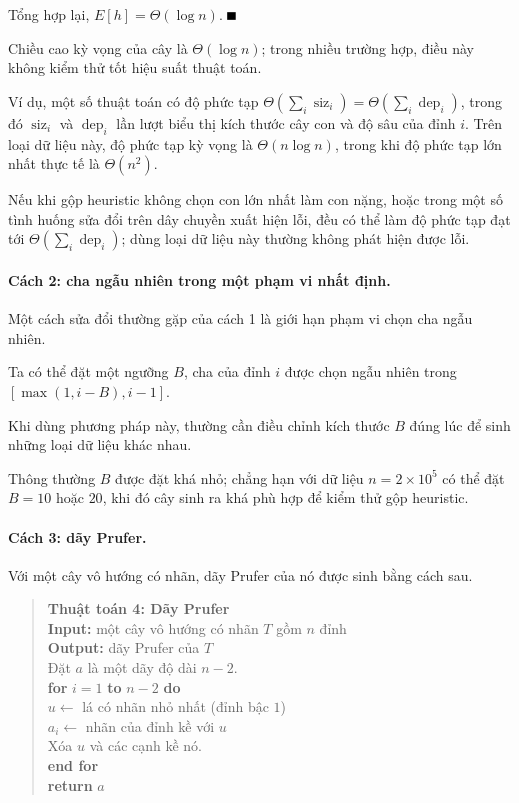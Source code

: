 \documentclass[11pt]{article}
\providecommand{\square}{\mathord{\vcenter{\hrule height .6em width .6em}}}
\begin{document}
Tổng hợp lại, $E[h]=\Theta(\log n)$. \hfill$\square$

Chiều cao kỳ vọng của cây là $\Theta(\log n)$; trong nhiều trường hợp, điều này
không kiểm thử tốt hiệu suất thuật toán.

Ví dụ, một số thuật toán có độ phức tạp
$\Theta(\sum_i \operatorname{siz}_i)=\Theta(\sum_i \operatorname{dep}_i)$, trong
đó $\operatorname{siz}_i$ và $\operatorname{dep}_i$ lần lượt biểu thị kích thước
cây con và độ sâu của đỉnh $i$. Trên loại dữ liệu này, độ phức tạp kỳ vọng là
$\Theta(n\log n)$, trong khi độ phức tạp lớn nhất thực tế là $\Theta(n^2)$.

Nếu khi gộp heuristic không chọn con lớn nhất làm con nặng, hoặc trong một số
tình huống sửa đổi trên dây chuyền xuất hiện lỗi, đều có thể làm độ phức tạp
đạt tới $\Theta(\sum_i \operatorname{dep}_i)$; dùng loại dữ liệu này thường
không phát hiện được lỗi.

\paragraph{Cách 2: cha ngẫu nhiên trong một phạm vi nhất định.}
Một cách sửa đổi thường gặp của cách 1 là giới hạn phạm vi chọn cha ngẫu nhiên.

Ta có thể đặt một ngưỡng $B$, cha của đỉnh $i$ được chọn ngẫu nhiên trong
$[\max(1,i-B),i-1]$.

Khi dùng phương pháp này, thường cần điều chỉnh kích thước $B$ đúng lúc để sinh
những loại dữ liệu khác nhau.

Thông thường $B$ được đặt khá nhỏ; chẳng hạn với dữ liệu $n=2\times 10^5$ có
thể đặt $B=10$ hoặc $20$, khi đó cây sinh ra khá phù hợp để kiểm thử gộp
heuristic.

\paragraph{Cách 3: dãy Prufer.}
Với một cây vô hướng có nhãn, dãy Prufer của nó được sinh bằng cách sau.

\begin{quote}
\textbf{Thuật toán 4: Dãy Prufer}\\
\textbf{Input:} một cây vô hướng có nhãn $T$ gồm $n$ đỉnh\\
\textbf{Output:} dãy Prufer của $T$\\
Đặt $a$ là một dãy độ dài $n-2$.\\
\textbf{for} $i=1$ \textbf{to} $n-2$ \textbf{do}\\
\hspace*{1.5em}$u\leftarrow$ lá có nhãn nhỏ nhất (đỉnh bậc $1$)\\
\hspace*{1.5em}$a_i\leftarrow$ nhãn của đỉnh kề với $u$\\
\hspace*{1.5em}Xóa $u$ và các cạnh kề nó.\\
\textbf{end for}\\
\textbf{return} $a$
\end{quote}
\end{document}
